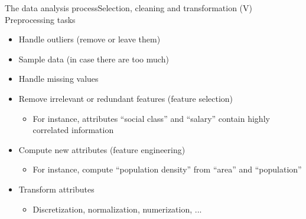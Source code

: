 \documentclass[10pt,compress]{beamer} %
\begin{document}
\begin{frame}{The data analysis process}{Selection, cleaning and transformation (V)}
	Preprocessing tasks
		\begin{itemize}
		\item Handle outliers (remove or leave them)
		\item Sample data (in case there are too much)
		\item Handle missing values
		\item Remove irrelevant or redundant features (\alert{feature selection})
			\begin{itemize} 
			\item For instance, attributes ``social class'' and ``salary'' contain highly correlated information
			\end{itemize}
		\item Compute new attributes (\alert{feature engineering})
			\begin{itemize}
			\item For instance, compute ``population density'' from ``area'' and ``population''
			\end{itemize}
		\item Transform attributes
			\begin{itemize}
				\item Discretization, normalization, numerization, ...
			\end{itemize}
		\end{itemize}
\end{frame}

\end{document}

